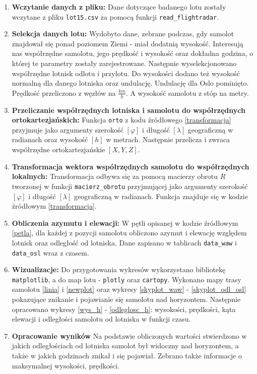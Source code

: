 \documentclass[fleqn,10pt,a4paper]{article}
\begin{document}
\begin{enumerate}
  \item \textbf{Wczytanie danych z pliku:} Dane dotyczące badanego lotu zostały wczytane z pliku \texttt{lot15.csv} za pomocą funkcji \texttt{read\_flightradar}.
  \item \textbf{Selekcja danych lotu:} Wydobyto dane, zebrane podczas, gdy samolot znajdował się ponad poziomem Ziemi - miał dodatnią wysokość.
  Interesują nas współrzędne samolotu, jego prędkość i wysokość oraz dokładna godzina, o której te parametry zostały zarejestrowane.  
  Następnie wyselekcjonowano współrzędne lotnisk odlotu i przylotu. Do wysokości dodano też wysokość normalną dla danego lotniska oraz undulację.
  Undulację dla Oslo pominięto. Prędkość przeliczono z węzłów na $\frac{km}{h}$. A wysokość samolotu z stóp na metry.
  \item \textbf{Przeliczanie współrzędnych lotniska i samolotu do współrzędnych ortokartezjańskich:} 
  Funkcja \texttt{orto} z kodu źródłowego \ref{transformacja} przyjmuje jako argumenty szerokość $[\varphi]$ i długość $[\lambda]$ geograficzną w radianach oraz wysokość $[h]$
  w metrach. Następnie przelicza i zwraca współrzędne ortokartezjańskie $[X, Y, Z]$.
  \item \textbf{Transformacja wektora współrzędnych samolotu do współrzędnych lokalnych:} 
  Transformacja odbywa się za pomocą macierzy obrotu $R$ tworzonej w funkcji \texttt{macierz\_obrotu} przyjmującej jako argumenty 
  szerokość $[\varphi]$ i długość $[\lambda]$ geograficzną w radianach. Funkcja znajduje się w kodzie źródłowym \ref{transformacja}.
  \item \textbf{Obliczenia azymutu i elewacji:} W pętli opisanej w kodzie źródłowym \ref{petla}, dla każdej z pozycji samolotu obliczono azymut i elewację względem lotnisk
  oraz odległość od lotniska. Dane zapisano w tablicach \texttt{data\_waw} i \texttt{data\_osl} wraz z czasem.
  \item \textbf{Wizualizacje:} Do przygotowania wykresów wykorzystano bibliotekę \texttt{matplotlib}, a do map lotu - \texttt{plotly} oraz \texttt{cartopy}.
  Wykonano mapy trasy samolotu \ref{linia} i \ref{newplot} oraz wykresy \ref{skyplot_waw} - \ref{skyplot_odl_osl} pokazujące znikanie i pojawianie się samolotu nad horyzontem.
  Następnie opracowano wykresy \ref{wys_h} - \ref{odleglosc_h}: wysokości, prędkości, kąta elewacji i odległości samolotu od lotniska w funkcji czasu.
  \item \textbf{Opracowanie wyników} Na podstawie obliczonych wartości stwierdzono w jakich odległościach od lotniska samolot był widoczny nad horyzontem,
  a także w jakich godzinach znikał i się pojawiał. Zebrano także informacje o maksymalnej wysokości, prędkości.
\end{enumerate}
\end{document}
